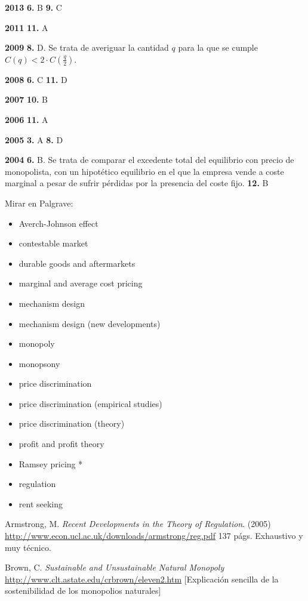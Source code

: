 \documentclass{nuevotema}
\begin{document}
\textbf{2013} \textbf{6.} B \textbf{9.} C

\textbf{2011} \textbf{11.} A

\textbf{2009} \textbf{8.} D. Se trata de averiguar la cantidad $q$ para la que se cumple $C(q) < 2\cdot C(\frac{q}{2})$.

\textbf{2008} \textbf{6.} C \textbf{11.} D

\textbf{2007} \textbf{10.} B

\textbf{2006} \textbf{11.} A

\textbf{2005} \textbf{3.} A \textbf{8.} D

\textbf{2004} \textbf{6.} B. Se trata de comparar el excedente total del equilibrio con precio de monopolista, con un hipotético equilibrio en el que la empresa vende a coste marginal a pesar de sufrir pérdidas por la presencia del coste fijo. \textbf{12.} B

\bibliografia

Mirar en Palgrave:
\begin{itemize}
	\item Averch-Johnson effect
	\item contestable market
	\item durable goods and aftermarkets
	\item marginal and average cost pricing
	\item mechanism design
	\item mechanism design (new developments)
	\item monopoly
	\item monopsony
	\item price discrimination
	\item price discrimination (empirical studies)
	\item price discrimination (theory)
	\item profit and profit theory
	\item Ramsey pricing *
	\item regulation
	\item rent seeking
\end{itemize}


Armstrong, M. \textit{Recent Developments in the Theory of Regulation}. (2005) \url{http://www.econ.ucl.ac.uk/downloads/armstrong/reg.pdf} 137 págs. Exhaustivo y muy técnico.

Brown, C. \textit{Sustainable and Unsustainable Natural Monopoly} \url{http://www.clt.astate.edu/crbrown/eleven2.htm} [Explicación sencilla de la sostenibilidad de los monopolios naturales]
\end{document}
